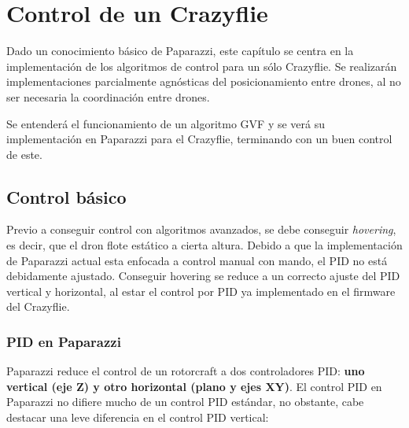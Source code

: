 \chapter{Control de un Crazyflie}

Dado un conocimiento básico de Paparazzi, este capítulo se centra en la 
implementación de los algoritmos de control para un sólo Crazyflie. 
Se realizarán implementaciones parcialmente agnósticas del posicionamiento entre drones,
al no ser necesaria la coordinación entre drones. 

Se entenderá el funcionamiento de un algoritmo GVF y se verá su 
implementación en Paparazzi para el Crazyflie, terminando con un buen control de este.


\section{Control básico}

Previo a conseguir control con algoritmos avanzados, se debe conseguir \textit{hovering}, 
es decir, que el dron flote estático a cierta altura. 
Debido a que la implementación de Paparazzi actual esta enfocada a control manual con mando, 
el PID no está debidamente ajustado. 
Conseguir hovering se reduce a un correcto ajuste del PID vertical y horizontal, 
al estar el control por PID ya implementado en el firmware del Crazyflie.


\subsection{PID en Paparazzi}

Paparazzi reduce el control de un rotorcraft a dos controladores PID: \textbf{uno vertical (eje Z) y otro horizontal (plano y ejes XY)}. 
El control PID en Paparazzi no difiere mucho de un control PID estándar, no obstante, cabe destacar una leve diferencia en el control PID vertical:

